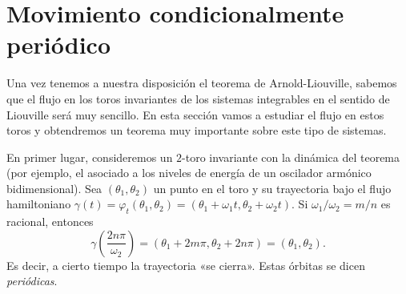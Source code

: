 \section{Movimiento condicionalmente periódico}\label{sec:promedios}
Una vez tenemos a nuestra disposición el teorema de Arnold-Liouville, sabemos que el flujo en los toros invariantes de los sistemas integrables en el sentido de Liouville será muy sencillo. En esta sección vamos a estudiar el flujo en estos toros y obtendremos un teorema muy importante sobre este tipo de sistemas.

  En primer lugar, consideremos un $2$-toro invariante con la dinámica del teorema (por ejemplo, el asociado a los niveles de energía de un oscilador armónico bidimensional). Sea $(\theta_1,\theta_2)$ un punto en el toro y su trayectoria bajo el flujo hamiltoniano $\gamma(t)=\varphi_t(\theta_1,\theta_2)=(\theta_1+\omega_1t,\theta_2+\omega_2t)$. Si $\omega_1/\omega_2=m/n$ es racional, entonces 
  \begin{equation*}
    \gamma\left(\frac{2n\pi}{\omega_2}\right) = (\theta_1+2m\pi,\theta_2+2n\pi)=(\theta_1,\theta_2).
  \end{equation*}
  Es decir, a cierto tiempo la trayectoria «se cierra». Estas órbitas se dicen \emph{periódicas}. 
 
